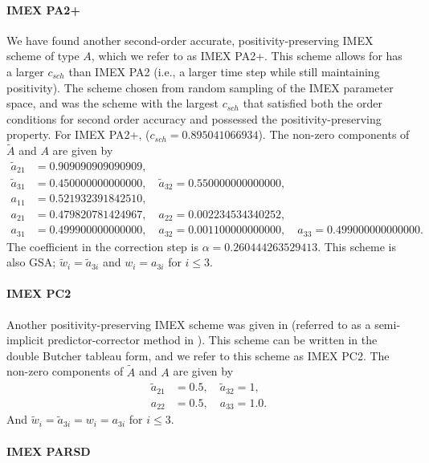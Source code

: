 \paragraph{IMEX PA2+}

We have found another second-order accurate, positivity-preserving IMEX scheme of type $A$, which we refer to as IMEX PA2+.  
This scheme allows for has a larger $c_{sch}$ than IMEX PA2 (i.e., a larger time step while still maintaining positivity).  
The scheme chosen from random sampling of the IMEX parameter space, and was the scheme with the largest $c_{sch}$ that satisfied both the order conditions for second order accuracy and possessed the positivity-preserving property.  
For IMEX PA2+, ($c_{sch} = 0.895041066934$). 
The non-zero components of $\tilde{A}$ and $A$ are given by
\begin{align}
  \tilde{a}_{21} &= 0.909090909090909, \nonumber \\
  \tilde{a}_{31} &= 0.450000000000000, \quad \tilde{a}_{32} = 0.550000000000000, \nonumber \\
  a_{11} &= 0.521932391842510, \nonumber \\
  a_{21} &= 0.479820781424967, \quad a_{22} = 0.002234534340252, \nonumber \\
  a_{31} &= 0.499900000000000, \quad a_{32} = 0.001100000000000, \quad a_{33} = 0.499000000000000. \nonumber
\end{align}
The coefficient in the correction step is $\alpha = 0.260444263529413$.  
This scheme is also GSA; $\tilde{w}_{i}=\tilde{a}_{3i}$ and $w_{i}=a_{3i}$ for $i\le3$.

\paragraph{IMEX PC2}

Another positivity-preserving IMEX scheme was given in \cite{mcclarren_etal_2008} (referred to as a semi-implicit predictor-corrector method in \cite{mcclarren_etal_2008}).  
This scheme can be written in the double Butcher tableau form, and we refer to this scheme as IMEX PC2.  
The non-zero components of $\tilde{A}$ and $A$ are given by
\begin{align}
  \tilde{a}_{21} &= 0.5, \quad \tilde{a}_{32} = 1, \nonumber \\
  a_{22} &= 0.5, \quad a_{33} = 1.0. \nonumber
\end{align}
And $\tilde{w}_{i}=\tilde{a}_{3i} = w_{i}=a_{3i}$ for $i\le3$.

\paragraph{IMEX PARSD}

